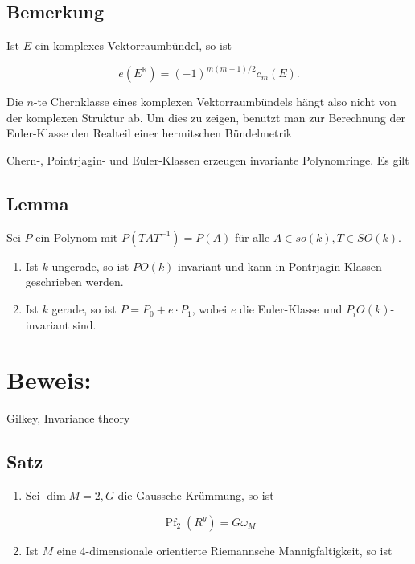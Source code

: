 \documentclass[10pt, letterpaper]{article}
\begin{document}
\subsection*{Bemerkung}
Ist $E$ ein komplexes Vektorraumbündel, so ist

$$
e\left(E^{\mathbb{R}}\right)=(-1)^{m(m-1) / 2} c_{m}(E) .
$$

Die $n$-te Chernklasse eines komplexen Vektorraumbündels hängt also nicht von der komplexen Struktur ab. Um dies zu zeigen, benutzt man zur Berechnung der Euler-Klasse den Realteil einer hermitschen Bündelmetrik

Chern-, Pointrjagin- und Euler-Klassen erzeugen invariante Polynomringe. Es gilt

\subsection*{Lemma}
Sei $P$ ein Polynom mit $P\left(T A T^{-1}\right)=P(A)$ für alle $A \in s o(k), T \in S O(k)$.

\begin{enumerate}
  \item Ist $k$ ungerade, so ist $P O(k)$-invariant und kann in Pontrjagin-Klassen geschrieben werden.
  \item Ist $k$ gerade, so ist $P=P_{0}+e \cdot P_{1}$, wobei $e$ die Euler-Klasse und $P_{i} O(k)$-invariant sind.
\end{enumerate}

\section*{Beweis:}
Gilkey, Invariance theory

\subsection*{Satz}
\begin{enumerate}
  \item Sei $\operatorname{dim} M=2, G$ die Gaussche Krümmung, so ist
\end{enumerate}

$$
\operatorname{Pf}_{2}\left(R^{g}\right)=G \omega_{M}
$$

\begin{enumerate}
  \setcounter{enumi}{1}
  \item Ist $M$ eine 4-dimensionale orientierte Riemannsche Mannigfaltigkeit, so ist
\end{enumerate}
\end{document}

